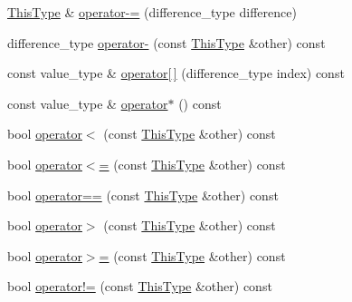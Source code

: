 \begin{DoxyCompactItemize}
\item 
\hyperlink{classvct_var_stride_matrix_const_iterator_af68182ea2024c532e999fd1333cb0c6e}{This\+Type} \& \hyperlink{classvct_var_stride_matrix_const_iterator_a45a5ebcc3983c0ce8265fb3eafb34621}{operator-\/=} (difference\+\_\+type difference)
\item 
difference\+\_\+type \hyperlink{classvct_var_stride_matrix_const_iterator_ae83074b51d8762c9614dd4fad3e133dc}{operator-\/} (const \hyperlink{classvct_var_stride_matrix_const_iterator_af68182ea2024c532e999fd1333cb0c6e}{This\+Type} \&other) const 
\item 
const value\+\_\+type \& \hyperlink{classvct_var_stride_matrix_const_iterator_ab782fc7bfc50b0575c01d8b77a293a84}{operator\mbox{[}$\,$\mbox{]}} (difference\+\_\+type index) const 
\item 
const value\+\_\+type \& \hyperlink{classvct_var_stride_matrix_const_iterator_a4628c053774ba753b8ceefb9305d62c8}{operator$\ast$} () const 
\item 
bool \hyperlink{classvct_var_stride_matrix_const_iterator_a8c038c000c5b8dc223358d2843054bb8}{operator$<$} (const \hyperlink{classvct_var_stride_matrix_const_iterator_af68182ea2024c532e999fd1333cb0c6e}{This\+Type} \&other) const 
\item 
bool \hyperlink{classvct_var_stride_matrix_const_iterator_a837e4aa15808810dae684b1d4789d63e}{operator$<$=} (const \hyperlink{classvct_var_stride_matrix_const_iterator_af68182ea2024c532e999fd1333cb0c6e}{This\+Type} \&other) const 
\item 
bool \hyperlink{classvct_var_stride_matrix_const_iterator_abe326522f82faad45384355857ddbb46}{operator==} (const \hyperlink{classvct_var_stride_matrix_const_iterator_af68182ea2024c532e999fd1333cb0c6e}{This\+Type} \&other) const 
\item 
bool \hyperlink{classvct_var_stride_matrix_const_iterator_a3615a778a236ec59b62d803ffb3e124f}{operator$>$} (const \hyperlink{classvct_var_stride_matrix_const_iterator_af68182ea2024c532e999fd1333cb0c6e}{This\+Type} \&other) const 
\item 
bool \hyperlink{classvct_var_stride_matrix_const_iterator_a5aa768c3753dd6121ae4b127d6e42281}{operator$>$=} (const \hyperlink{classvct_var_stride_matrix_const_iterator_af68182ea2024c532e999fd1333cb0c6e}{This\+Type} \&other) const 
\item 
bool \hyperlink{classvct_var_stride_matrix_const_iterator_a8cdf3c2ad9c67fca98a66a5b31ecf38c}{operator!=} (const \hyperlink{classvct_var_stride_matrix_const_iterator_af68182ea2024c532e999fd1333cb0c6e}{This\+Type} \&other) const 
\end{DoxyCompactItemize}
